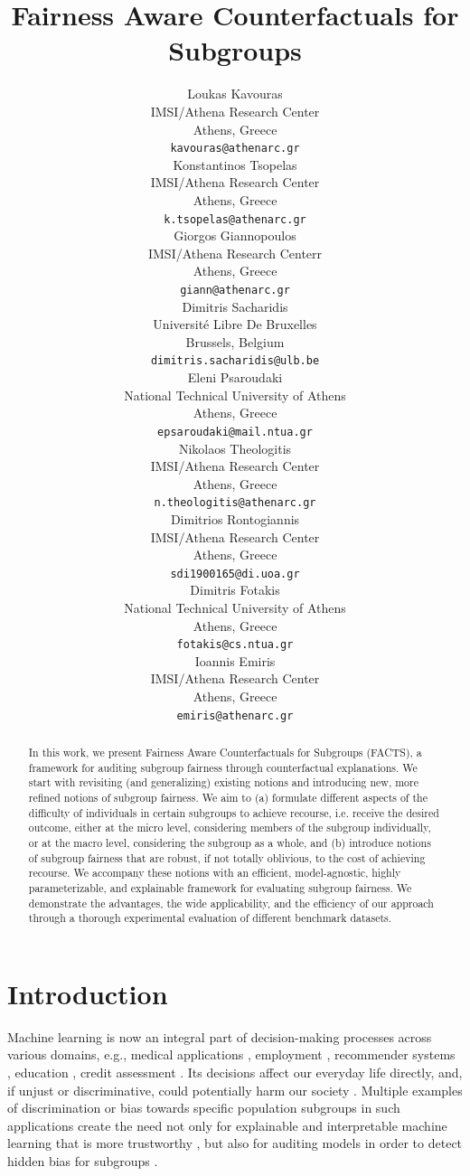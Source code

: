 \documentclass{article}
\title{Fairness Aware Counterfactuals for Subgroups}
\author{%
  Loukas Kavouras
    \\
  IMSI/Athena Research Center\\
  Athens, Greece\\
  \texttt{kavouras@athenarc.gr} \\
  \And
  Konstantinos Tsopelas
    \\
  IMSI/Athena Research Center\\
Athens, Greece\\
  \texttt{k.tsopelas@athenarc.gr} \\
  \And
  Giorgos Giannopoulos
    \\
  IMSI/Athena Research Centerr\\
 Athens, Greece\\
  \texttt{giann@athenarc.gr} \\
  \And
  Dimitris Sacharidis
    \\
  Université Libre De Bruxelles\\
Brussels, Belgium \\
  \texttt{dimitris.sacharidis@ulb.be} \\
  \And
  Eleni Psaroudaki \\
National Technical University of Athens\\ Athens, Greece\\
   \texttt{epsaroudaki@mail.ntua.gr} \\
   \And
    Nikolaos Theologitis\\
  IMSI/Athena Research Center\\
  Athens, Greece\\
  \texttt{n.theologitis@athenarc.gr} \\
  \And
  Dimitrios Rontogiannis\\
  IMSI/Athena Research Center\\
 Athens, Greece\\
  \texttt{sdi1900165@di.uoa.gr} \\
  \And
  Dimitris Fotakis\\
 National Technical University of Athens\\ 
   Athens, Greece\\
   \texttt{fotakis@cs.ntua.gr} \\
   \And
  Ioannis Emiris\\
  IMSI/Athena Research Center\\
  Athens, Greece \\
  \texttt{emiris@athenarc.gr} \\
}
\begin{document}
\maketitle


\begin{abstract}
In this work, we present Fairness Aware Counterfactuals for Subgroups (FACTS), a framework for auditing subgroup fairness through counterfactual explanations. We start with revisiting (and generalizing) existing notions and introducing new, more refined notions of subgroup fairness. We aim to (a) formulate different aspects of the difficulty of individuals in certain subgroups to achieve recourse, i.e. receive the desired outcome, either at the micro level, considering members of the subgroup individually, or at the macro level, considering the subgroup as a whole, and (b) introduce notions of subgroup fairness that are robust, if not totally oblivious, to the cost of achieving recourse. We accompany these notions with an efficient, model-agnostic, highly parameterizable, and explainable framework for evaluating subgroup fairness.
We demonstrate the advantages, the wide applicability, and the efficiency of our approach through a thorough experimental evaluation of different benchmark datasets. 
\end{abstract}

\section{Introduction}

Machine learning is now an integral part of decision-making processes across various domains, e.g., medical applications \cite{kyrimi2020medical}, employment \cite{bogen2018help, cohen2019efficient},  recommender systems \cite{pitoura2021fairness}, education \cite{loftus2018causal}, credit assessment \cite{boer2019just}. Its decisions affect our everyday life directly, and, if unjust or discriminative, could potentially harm our society \cite{osoba2017intelligence}. Multiple examples of discrimination or bias towards specific population subgroups in such applications \cite{Tashea_2017} create the need not only for explainable and interpretable machine learning that is more trustworthy \cite{burkart2021survey}, but also for auditing models in order to detect hidden bias for subgroups \cite{raji2019actionable}.
\end{document}
